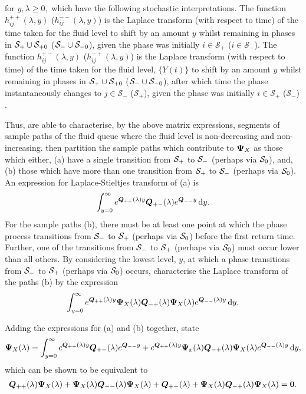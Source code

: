 for \(y,\lambda\geq 0,\) which have the following stochastic interpretations. The function \(h_{ij}^{++}(\lambda,y)\) (\(h_{ij}^{--}(\lambda,y)\)) is the Laplace transform (with respect to time) of the time taken for the fluid level to shift by an amount \(y\) whilst remaining in phases in \(\mathcal S_+\cup\mathcal{S}_{+0}\) (\(\mathcal S_-\cup\mathcal{S}_{-0}\)), given the phase was initially \(i\in\mathcal S_+\) (\(i\in\mathcal S_-\)). The function \(h_{ij}^{+-}(\lambda,y)\) (\(h_{ij}^{-+}(\lambda,y)\)) is the Laplace transform (with respect to time) of the time taken for the fluid level, \(\{Y(t)\}\) to shift by an amount \(y\) whilst remaining in phases in \(\mathcal S_+\cup\mathcal{S}_{+0}\) (\(\mathcal S_-\cup\mathcal{S}_{-0}\)), after which time the phase instantaneously changes to \(j\in\mathcal S_-\) (\(\mathcal S_+\)), given the phase was initially \(i\in\mathcal S_+\) (\(\mathcal S_-\)) \citep{bean2005}.

Thus, \cite{bean2005} are able to characterise, by the above matrix expressions, segments of sample paths of the fluid queue where the fluid level is non-decreasing and non-increasing. \cite{bean2005} then partition the sample paths which contribute to \(\boldsymbol \Psi_X\) as those which either, (a) have a single transition from \(\mathcal{S}_+\) to \(\mathcal{S}_-\) (perhaps via \(\mathcal{S}_0\)), and, (b) those which have more than one transition from \(\mathcal{S}_+\) to \(\mathcal{S}_-\) (perhaps via \(\mathcal{S}_0\)). An expression for Laplace-Stieltjes transform of (a) is 
\[\int_{y=0}^\infty e^{\boldsymbol Q_{++}(\lambda)y}\boldsymbol Q_{+-}(\lambda)e^{\boldsymbol Q_{--}y}\, \mathrm{d} y.\]
For the sample paths (b), there must be at least one point at which the phase process transitions from \(\mathcal{S}_-\) to \(\mathcal{S}_+\) (perhaps via \(\mathcal{S}_0\)) before the first return time. Further, one of the transitions from \(\mathcal{S}_-\) to \(\mathcal{S}_+\) (perhaps via \(\mathcal{S}_0\)) must occur lower than all others. By considering the lowest level, \(y\), at which a phase transitions from \(\mathcal{S}_-\) to \(\mathcal{S}_+\) (perhaps via \(\mathcal{S}_0\)) occurs, \cite{bean2005} characterise the Laplace transform of the paths (b) by the expression 
\begin{align}
	\int_{y=0}^\infty e^{\boldsymbol Q_{++}(\lambda)y} \boldsymbol \Psi_X(\lambda)\boldsymbol Q_{-+}(\lambda)\boldsymbol \Psi_X(\lambda) e^{\boldsymbol Q_{--}(\lambda)y}\, \mathrm{d} y.
\end{align}

Adding the expressions for (a) and (b) together, \cite{bean2005} state 
\begin{align}
	\boldsymbol \Psi_X(\lambda) = \int_{y=0}^\infty e^{\boldsymbol Q_{++}(\lambda)y}\boldsymbol Q_{+-}(\lambda)e^{\boldsymbol Q_{--}y} + e^{\boldsymbol Q_{++}(\lambda)y} \boldsymbol \Psi_x(\lambda)\boldsymbol Q_{-+}(\lambda)\boldsymbol \Psi_X(\lambda) e^{\boldsymbol Q_{--}(\lambda)y}\, \mathrm{d} y,
\end{align}
which can be shown to be equivalent to \citep[Lemma~3 and Theorem~9.2]{br1997}
\begin{align}
	\boldsymbol Q_{++}(\lambda)\boldsymbol \Psi_X(\lambda) + \boldsymbol \Psi_X(\lambda)\boldsymbol Q_{--}(\lambda)\boldsymbol \Psi_X(\lambda) + \boldsymbol Q_{+-}(\lambda) + \boldsymbol \Psi_X(\lambda)\boldsymbol Q_{-+}(\lambda)\boldsymbol \Psi_X(\lambda) = \boldsymbol 0.
\end{align}

